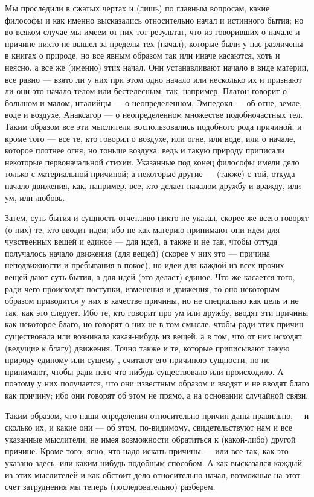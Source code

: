 \documentclass{article}
\begin{document}
Мы проследили в сжатых чертах и (лишь) по главным вопросам, какие философы и как именно высказались относительно начал и истинного бытия; но во всяком случае мы имеем от них тот результат, что из говоривших о начале и причине никто не вышел за пределы тех (начал), которые были у нас различены в книгах о природе, но все явным образом так или иначе касаются, хоть и неясно, а все же (именно) этих начал. Они устанавливают начало в виде материи, все равно — взято ли у них при этом одно начало или несколько их и признают ли они это начало телом или бестелесным; так, например, Платон говорит о большом и малом, италийцы — о неопределенном, Эмпедокл — об огне, земле, воде и воздухе, Анаксагор — о неопределенном множестве подобночастных тел. Таким образом все эти мыслители воспользовались подобного рода причиной, и кроме того — все те, кто говорил о воздухе, или огне, или воде, или о начале, которое плотнее огня, но тоньше воздуха:
\footnotemark[1]
ведь и такую природу приписали некоторые первоначальной стихии. Указанные под конец философы имели дело только с материальной причиной; а некоторые другие — (также) с той, откуда начало движения, как, например, все, кто делает началом дружбу и вражду, или ум, или любовь. 

Затем, суть бытия и сущность отчетливо никто не указал, скорее же всего говорят (о них) те, кто вводит идеи; ибо не как материю принимают они идеи для чувственных вещей и единое — для идей, а также и не так, чтобы оттуда получалось начало движения (для вещей) (скорее у них это — причина неподвижности и пребывания в покое), но идеи для каждой из всех прочих вещей дают суть бытия, а для идей (это делает) единое. Что же касается того, ради чего
\footnotemark[2]
происходят поступки, изменения и движения, то оно некоторым образом приводится у них в качестве причины, но не специально как цель и не так, как это следует. Ибо те, кто говорит про ум или дружбу, вводят эти причины как некоторое благо, но говорят о них не в том смысле, чтобы ради этих причин существовала или возникала какая-нибудь из вещей, а в том, что от них исходят (ведущие к благу) движения. Точно также и те, которые приписывают такую природу единому или сущему
\footnotemark[3]
, считают его причиною сущности, но не принимают, чтобы ради него что-нибудь существовало или происходило. А поэтому у них получается, что они известным образом и вводят и не вводят благо как причину; ибо они говорят об этом не прямо, а на основании случайной связи.

Таким образом, что наши определения относительно причин даны правильно,— и сколько их, и какие они — об этом, по-видимому, свидетельствуют нам и все указанные мыслители, не имея возможности обратиться к (какой-либо) другой причине. Кроме того, ясно, что надо искать причины — или все так, как это указано здесь, или каким-нибудь подобным способом.
\footnotemark[4]
А как высказался каждый из этих мыслителей и как обстоит дело относительно начал, возможные на этот счет затруднения мы теперь (последовательно) разберем.
\end{document}
